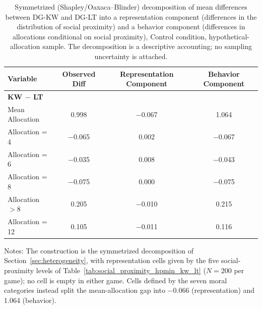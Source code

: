 \begin{table}[!htbp]
\centering
\caption{Symmetrized (Shapley/Oaxaca--Blinder) decomposition of mean differences between DG-KW and DG-LT into a representation component (differences in the distribution of social proximity) and a behavior component (differences in allocations conditional on social proximity), Control condition, hypothetical-allocation sample. The decomposition is a descriptive accounting; no sampling uncertainty is attached.}
\label{tab:decomposition_sym_kw_lt}
\begin{tabular}{lccc}
\toprule
\textbf{Variable} & \textbf{Observed Diff} & \textbf{Representation Component} & \textbf{Behavior Component} \\
\midrule
\multicolumn{4}{l}{\textbf{KW $-$ LT}} \\
Mean Allocation    & 0.998 & $-$0.067 & 1.064 \\
Allocation = 4     & $-$0.065 & 0.002 & $-$0.067 \\
Allocation = 6     & $-$0.035 & 0.008 & $-$0.043 \\
Allocation = 8     & $-$0.075 & 0.000 & $-$0.075 \\
Allocation $>8$    & 0.205 & $-$0.010 & 0.215 \\
Allocation = 12    & 0.105 & $-$0.011 & 0.116 \\
\bottomrule
\end{tabular}
\begin{flushleft}
\footnotesize Notes: The construction is the symmetrized decomposition of Section~\ref{sec:heterogeneity}, with representation cells given by the five social-proximity levels of Table~\ref{tab:social_proximity_hpmin_kw_lt} ($N=200$ per game); no cell is empty in either game. Cells defined by the seven moral categories instead split the mean-allocation gap into $-$0.066 (representation) and 1.064 (behavior).
\end{flushleft}
\end{table}
